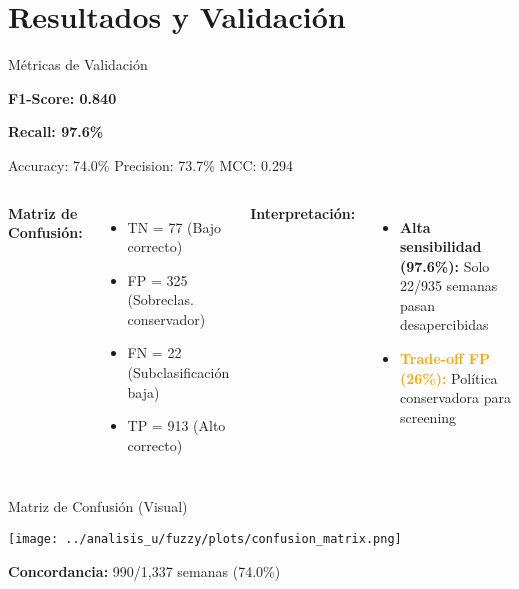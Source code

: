\documentclass[aspectratio=169]{beamer}
\begin{document}

\section{Resultados y Validación}

\begin{frame}{Métricas de Validación}

\begin{center}
\Huge
\textbf{F1-Score: 0.840}

\vspace{0.3cm}

\textbf{Recall: 97.6\%}

\vspace{0.3cm}

\large
Accuracy: 74.0\% \quad Precision: 73.7\% \quad MCC: 0.294
\end{center}

\vspace{0.5cm}

\begin{columns}[T]
\textbf{Matriz de Confusión:}
\begin{itemize}
    \item TN = 77 (Bajo correcto)
    \item FP = 325 (Sobreclas. conservador)
    \item FN = 22 (Subclasificación baja)
    \item TP = 913 (Alto correcto)
\end{itemize}

\textbf{Interpretación:}
\begin{itemize}
    \item \textcolor{VerdeAcento}{\textbf{Alta sensibilidad (97.6\%):}} Solo 22/935 semanas pasan desapercibidas
    \item \textcolor{orange}{\textbf{Trade-off FP (26\%):}} Política conservadora para screening
\end{itemize}
\end{columns}

\end{frame}


\begin{frame}{Matriz de Confusión (Visual)}

\begin{center}
\texttt{[image: ../analisis\_u/fuzzy/plots/confusion\_matrix.png]}
\end{center}

\textbf{Concordancia:} 990/1,337 semanas (74.0\%)

\end{frame}
\end{document}
